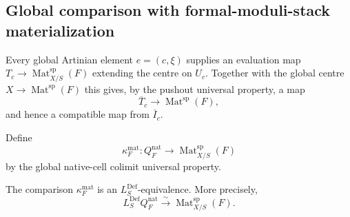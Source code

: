 \subsection{Global comparison with formal-moduli-stack materialization}

Every global Artinian element $e=(c,\xi)$ supplies an evaluation map
$T_c\to\operatorname{Mat}^{\mathrm{sp}}_{X/S}(F)$ extending the centre on
$U_c$.  Together with the global centre $X\to\operatorname{Mat}^{\mathrm{sp}}(F)$
this gives, by the pushout universal property, a map
\[
    \overline T_c\longrightarrow\operatorname{Mat}^{\mathrm{sp}}(F),
\]
and hence a compatible map from $\overline I_c$.

\begin{definition}
\label{def:bnli-native-materialized-comparison}
Define
\[
\boxed{
    \kappa_F^{\mathrm{mat}}:
    Q_F^{\mathrm{nat}}
    \longrightarrow
    \operatorname{Mat}^{\mathrm{sp}}_{X/S}(F)}
\]
by the global native-cell colimit universal property.
\end{definition}

\begin{theorem}
\label{thm:bnli-native-quotient-materialization}
The comparison $\kappa_F^{\mathrm{mat}}$ is an
$L_S^{\mathrm{Def}}$-equivalence.  More precisely,
\[
\boxed{
    L_S^{\mathrm{Def}}Q_F^{\mathrm{nat}}
    \xrightarrow{\sim}
    \operatorname{Mat}^{\mathrm{sp}}_{X/S}(F).}
\]
\end{theorem}

